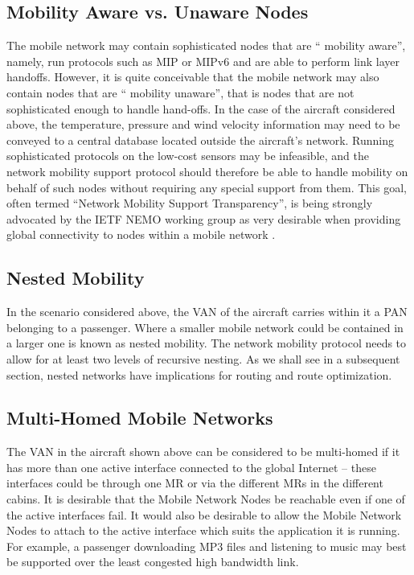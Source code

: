 \subsection{Mobility Aware vs. Unaware Nodes}

The mobile network may contain sophisticated nodes that are \textquotedblleft
mobility aware\textquotedblright, namely, run protocols such as MIP or MIPv6
and are able to perform link layer handoffs. However, it is quite conceivable
that the mobile network may also contain nodes that are \textquotedblleft
mobility unaware\textquotedblright, that is nodes that are not sophisticated
enough to handle hand-offs. In the case of the aircraft considered above, the
temperature, pressure and wind velocity information may need to be conveyed to
a central database located outside the aircraft's network. Running
sophisticated protocols on the low-cost sensors may be infeasible, and the
network mobility support protocol should therefore be able to handle mobility
on behalf of such nodes without requiring any special support from them. This
goal, often termed \textquotedblleft Network Mobility Support
Transparency\textquotedblright, is being strongly advocated by the IETF NEMO
working group as very desirable when providing global connectivity to nodes
within a mobile network \cite{7}.

\subsection{Nested Mobility}

In the scenario considered above, the VAN of the aircraft carries within it a
PAN belonging to a passenger. Where a smaller mobile network could be
contained in a larger one is known as nested mobility. The network mobility
protocol needs to allow for at least two levels of recursive nesting.
As we shall see in a subsequent section, nested networks have implications for
routing and route optimization.

\subsection{Multi-Homed Mobile Networks}

The VAN in the aircraft shown above can be considered to be multi-homed if it
has more than one active interface connected to the global Internet -- these
interfaces could be through one MR or via the different MRs in the different
cabins. It is desirable that the Mobile Network Nodes be reachable even if one
of the active interfaces fail. It would also be desirable to allow the Mobile
Network Nodes to attach to the active interface which suits the application it
is running. For example, a passenger downloading MP3 files and listening to
music may best be supported over the least congested high bandwidth link.

